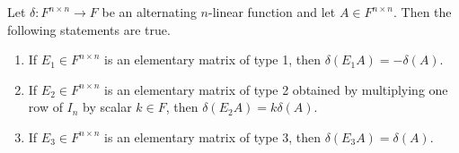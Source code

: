 \begin{proposition}
  Let $\delta: F^{n \times n} \to F$ be an alternating $n$-linear function
  and let $A \in F^{n \times n}$.
  Then the following statements are true.
  \begin{enumerate}
    \item If $E_1 \in F^{n \times n}$ is an elementary matrix of type 1,
    then $\delta(E_1A) = -\delta(A)$.
    \item If $E_2 \in F^{n \times n}$ is an elementary matrix of type 2
    obtained by multiplying one row of $I_n$ by scalar $k \in F$,
    then $\delta(E_2A) = k\delta(A)$.
    \item If $E_3 \in F^{n \times n}$ is an elementary matrix of type 3,
    then $\delta(E_3A) = \delta(A)$.
  \end{enumerate}
\end{proposition}
